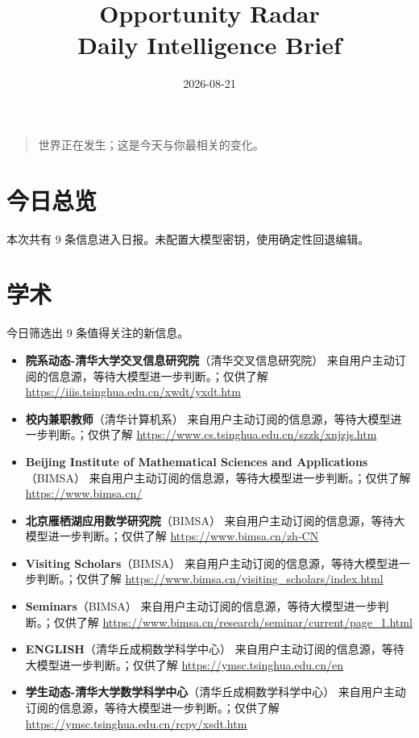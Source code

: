 \documentclass[11pt]{ctexart}
\title{Opportunity Radar\\Daily Intelligence Brief}
\date{2026-08-21}
\begin{document}
\maketitle
\begin{quote}\Large 世界正在发生；这是今天与你最相关的变化。\end{quote}
\section*{今日总览}
本次共有 9 条信息进入日报。未配置大模型密钥，使用确定性回退编辑。
\section*{学术}
今日筛选出 9 条值得关注的新信息。
\begin{itemize}
\item \textbf{院系动态-清华大学交叉信息研究院}（清华交叉信息研究院） 来自用户主动订阅的信息源，等待大模型进一步判断。；仅供了解 \url{https://iiis.tsinghua.edu.cn/xwdt/yxdt.htm}
\item \textbf{校内兼职教师}（清华计算机系） 来自用户主动订阅的信息源，等待大模型进一步判断。；仅供了解 \url{https://www.cs.tsinghua.edu.cn/szzk/xnjzjs.htm}
\item \textbf{Beijing Institute of Mathematical Sciences and Applications}（BIMSA） 来自用户主动订阅的信息源，等待大模型进一步判断。；仅供了解 \url{https://www.bimsa.cn/}
\item \textbf{北京雁栖湖应用数学研究院}（BIMSA） 来自用户主动订阅的信息源，等待大模型进一步判断。；仅供了解 \url{https://www.bimsa.cn/zh-CN}
\item \textbf{Visiting Scholars}（BIMSA） 来自用户主动订阅的信息源，等待大模型进一步判断。；仅供了解 \url{https://www.bimsa.cn/visiting_scholars/index.html}
\item \textbf{Seminars}（BIMSA） 来自用户主动订阅的信息源，等待大模型进一步判断。；仅供了解 \url{https://www.bimsa.cn/research/seminar/current/page_1.html}
\item \textbf{ENGLISH}（清华丘成桐数学科学中心） 来自用户主动订阅的信息源，等待大模型进一步判断。；仅供了解 \url{https://ymsc.tsinghua.edu.cn/en}
\item \textbf{学生动态-清华大学数学科学中心}（清华丘成桐数学科学中心） 来自用户主动订阅的信息源，等待大模型进一步判断。；仅供了解 \url{https://ymsc.tsinghua.edu.cn/rcpy/xsdt.htm}
\end{itemize}
\end{document}

